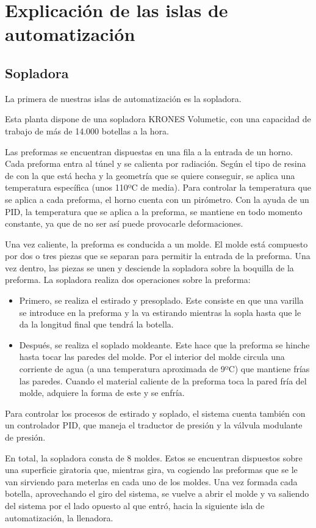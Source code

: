\documentclass[11pt,a4paper,spanish,twoside]{report}
\begin{document}
\chapter{Explicación de las islas de automatización}
\section{Sopladora}
La primera de nuestras islas de automatización es la sopladora.

Esta planta dispone de una sopladora KRONES Volumetic, con una capacidad de 
trabajo de más de 14.000 botellas a la hora.

Las preformas se encuentran dispuestas en una fila a la entrada de un horno. 
Cada preforma entra al túnel y se calienta por radiación. Según el tipo de 
resina de con la que está hecha y la geometría que se quiere conseguir, se 
aplica una temperatura específica (unos 110ºC de media). Para controlar la 
temperatura que se aplica a cada preforma, el horno cuenta con un pirómetro.
Con la ayuda de un PID, la temperatura que se aplica a la preforma, se 
mantiene en todo momento constante, ya que de no ser así puede provocarle
deformaciones.

Una vez caliente, la preforma es conducida a un molde. El molde está compuesto 
por dos o tres piezas que se separan para permitir la entrada de la preforma. 
Una vez dentro, las piezas se unen y desciende la sopladora sobre la boquilla 
de la preforma. La sopladora realiza dos operaciones sobre la preforma:
\begin{itemize}
\item Primero, se realiza el estirado y presoplado. Este consiste en que una 
varilla se introduce en la preforma y la va estirando mientras la sopla hasta 
que le da la longitud final que tendrá la botella.
\item Después, se realiza el soplado moldeante. Este hace que la preforma se
hinche hasta tocar las paredes del molde. Por el interior del molde circula 
una corriente de agua (a una temperatura aproximada de 9ºC) que mantiene frías 
las paredes. Cuando el material caliente de la preforma toca la pared fría del 
molde, adquiere la forma de este y se enfría.
\end{itemize}
Para controlar los procesos de estirado y soplado, el sistema cuenta también 
con un controlador PID, que maneja el traductor de presión y la válvula 
modulante de presión.

En total, la sopladora consta de 8 moldes. Estos se encuentran dispuestos 
sobre una superficie giratoria que, mientras gira, va cogiendo las preformas 
que se le van sirviendo para meterlas en cada uno de los moldes. Una vez 
formada cada botella, aprovechando el giro del sistema, se vuelve a abrir el 
molde y va saliendo del sistema por el lado opuesto al que entró, hacia la 
siguiente isla de automatización, la llenadora.
\end{document}
